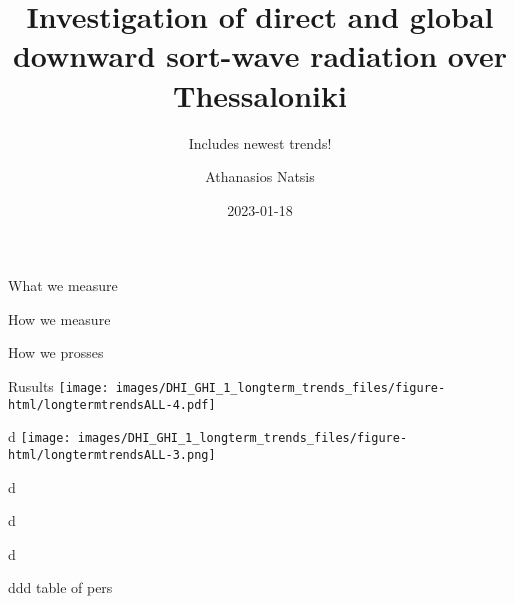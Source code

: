 \documentclass[
  ignorenonframetext,
]{beamer}
\title{Investigation of direct and global downward sort-wave radiation
over Thessaloniki}
\subtitle{Includes newest trends!}
\author{Athanasios Natsis}
\date{2023-01-18}
\begin{document}
\frame{\titlepage}
\ifdefined\Shaded\renewenvironment{Shaded}{\begin{tcolorbox}[boxrule=0pt, interior hidden, sharp corners, borderline west={3pt}{0pt}{shadecolor}, enhanced, breakable, frame hidden]}{\end{tcolorbox}}\fi

\begin{frame}{What we measure}
\protect\hypertarget{what-we-measure}{}
\end{frame}

\begin{frame}{How we measure}
\protect\hypertarget{how-we-measure}{}
\end{frame}

\begin{frame}{How we prosses}
\protect\hypertarget{how-we-prosses}{}
\end{frame}

\begin{frame}{Rusults}
\protect\hypertarget{rusults}{}
\texttt{[image: images/DHI\_GHI\_1\_longterm\_trends\_files/figure-html/longtermtrendsALL-4.pdf]}
\end{frame}

\begin{frame}{3}
\protect\hypertarget{section}{}
\end{frame}

\begin{frame}{d}
\protect\hypertarget{d}{}
\texttt{[image: images/DHI\_GHI\_1\_longterm\_trends\_files/figure-html/longtermtrendsALL-3.png]}
\end{frame}

\begin{frame}{d}
\protect\hypertarget{d-1}{}
\end{frame}

\begin{frame}{d}
\protect\hypertarget{d-2}{}
\end{frame}

\begin{frame}{d}
\protect\hypertarget{d-3}{}
\end{frame}

\begin{frame}{ddd}
\protect\hypertarget{ddd}{}
table of pers
\end{frame}

\begin{frame}{4}
\protect\hypertarget{section-1}{}
\end{frame}

\begin{frame}{5}
\protect\hypertarget{section-2}{}
\begin{columns}[T]
\begin{column}{0.5\textwidth}
\end{column}

\begin{column}{0.5\textwidth}
\end{column}
\end{columns}
\end{frame}
\end{document}
